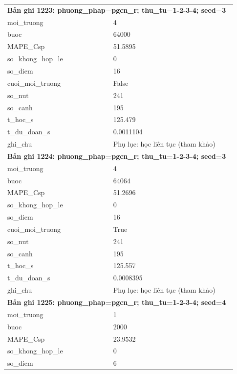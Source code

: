 \begin{longtable}{p{0.43\linewidth}p{0.50\linewidth}}
\midrule
\multicolumn{2}{p{0.95\linewidth}}{\textbf{Bản ghi 1223: phuong\_phap=pgcn\_r; thu\_tu=1-2-3-4; seed=3}} \\
moi\_\allowbreak truong & 4 \\
buoc & 64000 \\
MAPE\_\allowbreak Csp & 51.5895 \\
so\_\allowbreak khong\_\allowbreak hop\_\allowbreak le & 0 \\
so\_\allowbreak diem & 16 \\
cuoi\_\allowbreak moi\_\allowbreak truong & False \\
so\_\allowbreak nut & 241 \\
so\_\allowbreak canh & 195 \\
t\_\allowbreak hoc\_\allowbreak s & 125.479 \\
t\_\allowbreak du\_\allowbreak doan\_\allowbreak s & 0.0011104 \\
ghi\_\allowbreak chu & Phụ lục: học liên tục (tham khảo) \\
\midrule
\multicolumn{2}{p{0.95\linewidth}}{\textbf{Bản ghi 1224: phuong\_phap=pgcn\_r; thu\_tu=1-2-3-4; seed=3}} \\
moi\_\allowbreak truong & 4 \\
buoc & 64064 \\
MAPE\_\allowbreak Csp & 51.2696 \\
so\_\allowbreak khong\_\allowbreak hop\_\allowbreak le & 0 \\
so\_\allowbreak diem & 16 \\
cuoi\_\allowbreak moi\_\allowbreak truong & True \\
so\_\allowbreak nut & 241 \\
so\_\allowbreak canh & 195 \\
t\_\allowbreak hoc\_\allowbreak s & 125.557 \\
t\_\allowbreak du\_\allowbreak doan\_\allowbreak s & 0.0008395 \\
ghi\_\allowbreak chu & Phụ lục: học liên tục (tham khảo) \\
\midrule
\multicolumn{2}{p{0.95\linewidth}}{\textbf{Bản ghi 1225: phuong\_phap=pgcn\_r; thu\_tu=1-2-3-4; seed=4}} \\
moi\_\allowbreak truong & 1 \\
buoc & 2000 \\
MAPE\_\allowbreak Csp & 23.9532 \\
so\_\allowbreak khong\_\allowbreak hop\_\allowbreak le & 0 \\
so\_\allowbreak diem & 6 \\

\end{longtable}
